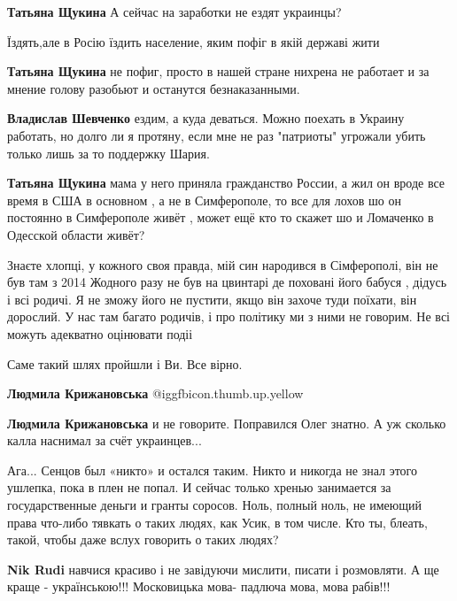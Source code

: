 \begin{itemize}
\begin{itemize} %
\textbf{Татьяна Щукина} А сейчас на заработки не ездят украинцы?

Їздять,але в Росію їздить население, яким пофіг в якій державі жити

\textbf{Татьяна Щукина} не пофиг, просто в нашей стране нихрена не работает и за мнение голову разобьют и останутся безнаказанными.

\textbf{Владислав Шевченко} ездим, а куда деваться. Можно поехать в Украину работать, но долго ли я протяну, если мне не раз "патриоты" угрожали убить только лишь за то поддержку Шария.

\textbf{Татьяна Щукина} мама у него приняла гражданство России, а жил он вроде все время в США в основном , а не в Симферополе, то все для лохов шо он постоянно в Симферополе живёт , может ещё кто то скажет шо и Ломаченко в Одесской области живёт?


Знаєте хлопці, у кожного своя правда, мій син народився в Сімферополі, він не
був там з 2014 Жодного разу не був на цвинтарі де поховані його бабуся , дідусь
і всі родичі. Я не зможу його не пустити, якщо він захоче туди поїхати, він
дорослий. У нас там багато родичів, і про політику ми з ними не говорим. Не всі
можуть адекватно оцінювати подіі

\end{itemize} %

Саме такий шлях пройшли і Ви. Все вірно.

\begin{itemize} %
\textbf{Людмила Крижановська}  @igg{fbicon.thumb.up.yellow} 

\textbf{Людмила Крижановська} и не говорите. Поправился Олег знатно. А уж сколько калла наснимал за счёт украинцев...


Ага... Сенцов был «никто» и остался таким. Никто и никогда не знал этого ушлепка,
пока в плен не попал. И сейчас только хренью занимается за государственные
деньги и гранты соросов. Ноль, полный ноль, не имеющий права что-либо тявкать о
таких людях, как Усик, в том числе. Кто ты, блеать, такой, чтобы даже вслух
говорить о таких людях?

\textbf{Nik Rudi} навчися красиво і не завідуючи мислити, писати і розмовляти.
А ще краще - українською!!! Московицька мова- падлюча мова, мова рабів!!!


\end{itemize}
\end{itemize}
